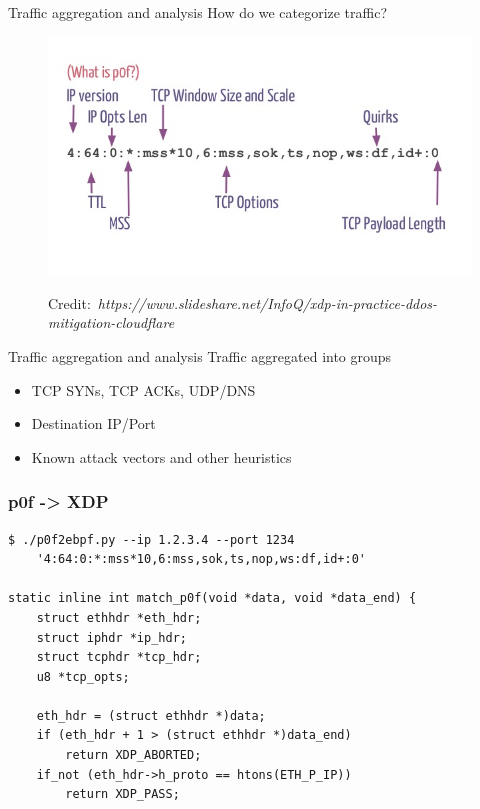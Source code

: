\documentclass{beamer}
\newcommand{\credit}[1]{\par\hfill \tiny Credit:~\itshape#1}
\begin{document}
\begin{frame}{Traffic aggregation and analysis}
  How do we categorize traffic?
  \pause
  \begin{figure}
    \includegraphics[width=\linewidth]{./p0f.jpg}
    \credit{https://www.slideshare.net/InfoQ/xdp-in-practice-ddos-mitigation-cloudflare}
  \end{figure}
\end{frame}

\begin{frame}{Traffic aggregation and analysis}
  Traffic aggregated into groups
  \begin{itemize}
    \item TCP SYNs, TCP ACKs, UDP/DNS
    \item Destination IP/Port
    \item Known attack vectors and other heuristics
  \end{itemize}
\end{frame}

\begin{frame}[fragile]
\frametitle{p0f -> XDP}
\begin{verbatim}
$ ./p0f2ebpf.py --ip 1.2.3.4 --port 1234 
    '4:64:0:*:mss*10,6:mss,sok,ts,nop,ws:df,id+:0'

static inline int match_p0f(void *data, void *data_end) {
    struct ethhdr *eth_hdr;
    struct iphdr *ip_hdr;
    struct tcphdr *tcp_hdr;
    u8 *tcp_opts;

    eth_hdr = (struct ethhdr *)data;
    if (eth_hdr + 1 > (struct ethhdr *)data_end)
        return XDP_ABORTED;
    if_not (eth_hdr->h_proto == htons(ETH_P_IP))
        return XDP_PASS;


\end{verbatim}
\end{frame}
\end{document}
